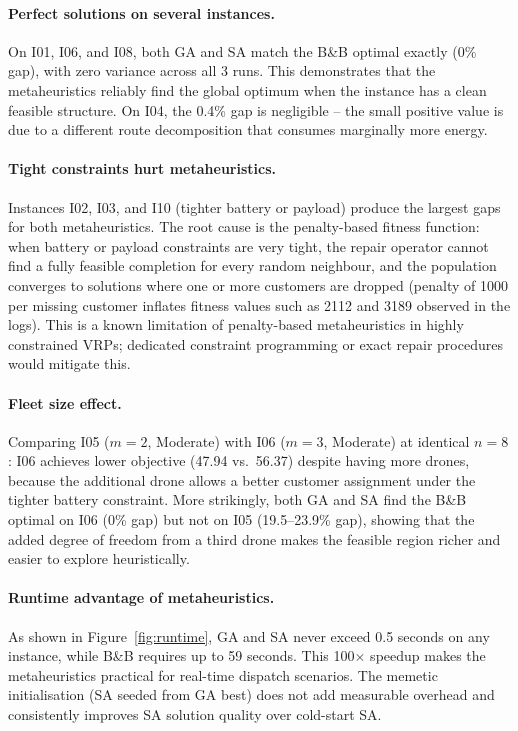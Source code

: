\documentclass[12pt,a4paper]{article}
\begin{document}
\paragraph{Perfect solutions on several instances.}
On I01, I06, and I08, both GA and SA match the B\&B optimal exactly (0\% gap), with
zero variance across all 3 runs. This demonstrates that the metaheuristics reliably find
the global optimum when the instance has a clean feasible structure. On I04, the 0.4\%
gap is negligible -- the small positive value is due to a different route decomposition
that consumes marginally more energy.

\paragraph{Tight constraints hurt metaheuristics.}
Instances I02, I03, and I10 (tighter battery or payload) produce the largest gaps for
both metaheuristics. The root cause is the penalty-based fitness function: when battery
or payload constraints are very tight, the repair operator cannot find a fully feasible
completion for every random neighbour, and the population converges to solutions where
one or more customers are dropped (penalty of 1000 per missing customer inflates
fitness values such as 2112 and 3189 observed in the logs). This is a known limitation
of penalty-based metaheuristics in highly constrained VRPs; dedicated constraint
programming or exact repair procedures would mitigate this.

\paragraph{Fleet size effect.}
Comparing I05 ($m=2$, Moderate) with I06 ($m=3$, Moderate) at identical $n=8$: I06
achieves lower objective (47.94 vs.\ 56.37) despite having more drones, because the
additional drone allows a better customer assignment under the tighter battery constraint.
More strikingly, both GA and SA find the B\&B optimal on I06 (0\% gap) but not on I05
(19.5--23.9\% gap), showing that the added degree of freedom from a third drone makes
the feasible region richer and easier to explore heuristically.

\paragraph{Runtime advantage of metaheuristics.}
As shown in Figure~\ref{fig:runtime}, GA and SA never exceed 0.5 seconds on any
instance, while B\&B requires up to 59 seconds. This 100$\times$ speedup makes the
metaheuristics practical for real-time dispatch scenarios. The memetic initialisation
(SA seeded from GA best) does not add measurable overhead and consistently improves SA
solution quality over cold-start SA.
\end{document}
